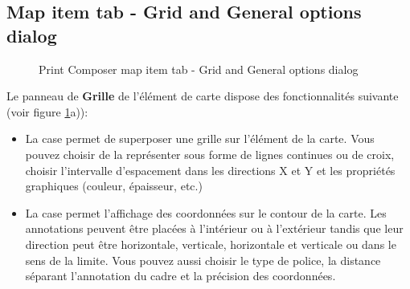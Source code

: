 \subsection{Map item tab - Grid and General options dialog}

\begin{figure}[ht]
\centering
   \hspace{1cm}
   \caption{Print Composer map item tab - Grid and General options dialog \nixcaption}\label{fig:sec_map_dialog}
\end{figure}


Le panneau de \textbf{Grille} de l'élément de carte dispose des fonctionnalités suivante (voir figure \ref{fig:sec_map_dialog}a)):

\begin{itemize}[label=--]
\item La case  permet de superposer une grille sur l'élément de la carte. Vous pouvez choisir de la représenter sous forme de lignes continues ou de croix, choisir l'intervalle d'espacement dans les directions X et Y et les propriétés graphiques (couleur, épaisseur, etc.)
\item La case  permet l'affichage des coordonnées sur le contour de la carte. Les annotations peuvent être placées à l'intérieur ou à l'extérieur tandis que leur direction peut être horizontale, verticale, horizontale et verticale ou dans le sens de la limite. Vous pouvez aussi choisir le type de police, la distance séparant l'annotation du cadre et la précision des coordonnées. 
\end{itemize}

